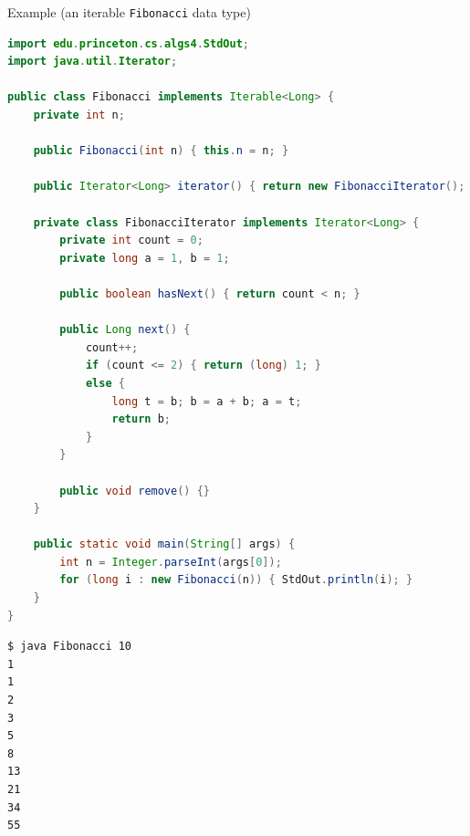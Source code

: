 \documentclass[8pt,a4paper,compress]{beamer}
\begin{document}
\begin{frame}[fragile]
\pause

Example (an iterable \lstinline{Fibonacci} data type)
\begin{lstlisting}[language=Java]
import edu.princeton.cs.algs4.StdOut;
import java.util.Iterator;

public class Fibonacci implements Iterable<Long> {
    private int n;

    public Fibonacci(int n) { this.n = n; }

    public Iterator<Long> iterator() { return new FibonacciIterator(); }

    private class FibonacciIterator implements Iterator<Long> {
        private int count = 0;
        private long a = 1, b = 1;

        public boolean hasNext() { return count < n; }

        public Long next() {
            count++;
            if (count <= 2) { return (long) 1; }
            else { 
                long t = b; b = a + b; a = t;
                return b;
            }
        }
        
        public void remove() {}
    }

    public static void main(String[] args) {
        int n = Integer.parseInt(args[0]);
        for (long i : new Fibonacci(n)) { StdOut.println(i); }
    }
}
\end{lstlisting}
\end{frame}

\begin{frame}[fragile]
\pause

\begin{lstlisting}[language={}]
$ java Fibonacci 10
1
1
2
3
5
8
13
21
34
55
\end{lstlisting}
\end{frame}
\end{document}
